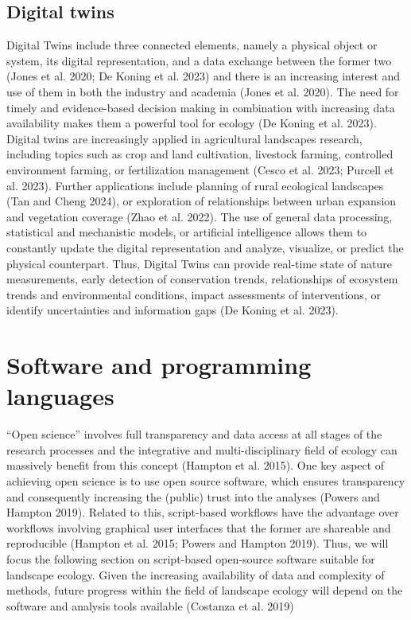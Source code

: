 \documentclass[
  10pt,
  a4paperpaper,
]{article}
\begin{document}
\subsection{Digital twins}\label{digital-twins}

Digital Twins include three connected elements, namely a physical object
or system, its digital representation, and a data exchange between the
former two (Jones et al. 2020; De Koning et al. 2023) and there is an
increasing interest and use of them in both the industry and academia
(Jones et al. 2020). The need for timely and evidence-based decision
making in combination with increasing data availability makes them a
powerful tool for ecology (De Koning et al. 2023). Digital twins are
increasingly applied in agricultural landscapes research, including
topics such as crop and land cultivation, livestock farming, controlled
environment farming, or fertilization management (Cesco et al. 2023;
Purcell et al. 2023). Further applications include planning of rural
ecological landscapes (Tan and Cheng 2024), or exploration of
relationships between urban expansion and vegetation coverage (Zhao et
al. 2022). The use of general data processing, statistical and
mechanistic models, or artificial intelligence allows them to constantly
update the digital representation and analyze, visualize, or predict the
physical counterpart. Thus, Digital Twins can provide real-time state of
nature measurements, early detection of conservation trends,
relationships of ecosystem trends and environmental conditions, impact
assessments of interventions, or identify uncertainties and information
gaps (De Koning et al. 2023).

\section{Software and programming
languages}\label{software-and-programming-languages}

``Open science'' involves full transparency and data access at all
stages of the research processes and the integrative and
multi-disciplinary field of ecology can massively benefit from this
concept (Hampton et al. 2015). One key aspect of achieving open science
is to use open source software, which ensures transparency and
consequently increasing the (public) trust into the analyses (Powers and
Hampton 2019). Related to this, script-based workflows have the
advantage over workflows involving graphical user interfaces that the
former are shareable and reproducible (Hampton et al. 2015; Powers and
Hampton 2019). Thus, we will focus the following section on script-based
open-source software suitable for landscape ecology. Given the
increasing availability of data and complexity of methods, future
progress within the field of landscape ecology will depend on the
software and analysis tools available (Costanza et al. 2019)
\end{document}
